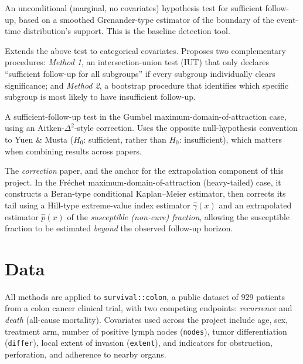\documentclass[11pt]{article}
\begin{document}
\begin{description}[leftmargin=1.2em, style=nextline]
    \item[Yuen \& Musta (2024/2026)] \citep{yuenmusta2024} An unconditional
    (marginal, no covariates) hypothesis test for sufficient follow-up, based on a
    smoothed Grenander-type estimator of the boundary of the event-time
    distribution's support. This is the baseline detection tool.

    \item[Yuen, Musta \& Van Keilegom (2025)] \citep{yuenmustavankeilegom2025}
    Extends the above test to categorical covariates. Proposes two complementary
    procedures: \emph{Method 1}, an intersection-union test (IUT) that only
    declares ``sufficient follow-up for all subgroups'' if every subgroup
    individually clears significance; and \emph{Method 2}, a bootstrap procedure
    that identifies which specific subgroup is most likely to have insufficient
    follow-up.

    \item[Xie, Escobar-Bach \& Van Keilegom (2023/2024)] \citep{xieebvk2023} A
    sufficient-follow-up test in the Gumbel maximum-domain-of-attraction case, using
    an Aitken-$\Delta^2$-style correction. Uses the opposite null-hypothesis
    convention to Yuen \& Musta ($H_0$: sufficient, rather than $H_0$: insufficient),
    which matters when combining results across papers.

    \item[Escobar-Bach \& Van Keilegom (2019/2023)] \citep{ebvk2023} The
    \emph{correction} paper, and the anchor for the extrapolation component of this
    project. In the Fr\'echet maximum-domain-of-attraction (heavy-tailed) case, it
    constructs a Beran-type conditional Kaplan--Meier estimator, then corrects its
    tail using a Hill-type extreme-value index estimator $\hat\gamma(x)$ and an
    extrapolated estimator $\hat p(x)$ of the \emph{susceptible (non-cure) fraction},
    allowing the susceptible fraction to be estimated \emph{beyond} the observed
    follow-up horizon.
\end{description}


\section{Data}

All methods are applied to \texttt{survival::colon}, a public dataset of 929
patients from a colon cancer clinical trial, with two competing endpoints:
\emph{recurrence} and \emph{death} (all-cause mortality). Covariates used across
the project include age, sex, treatment arm, number of positive lymph nodes
(\texttt{nodes}), tumor differentiation (\texttt{differ}), local extent of
invasion (\texttt{extent}), and indicators for obstruction, perforation, and
adherence to nearby organs.
\end{document}
